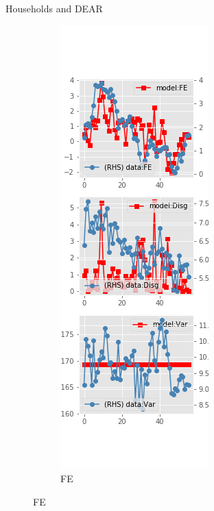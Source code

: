 \documentclass{beamer}
\begin{document}
\begin{frame}{Households and DEAR}
	\begin{figure}[ht]
		\label{DE_diag_SCE}
		\begin{subfigure}[b]{0.2\textwidth}
			\centering
			\caption{FE}
			\includegraphics[width=\textwidth, height = 0.8\textheight]{figuresDraft/sce_de_est_diag0.png}

\end{subfigure}
\end{figure}
\end{frame}
\end{document}
